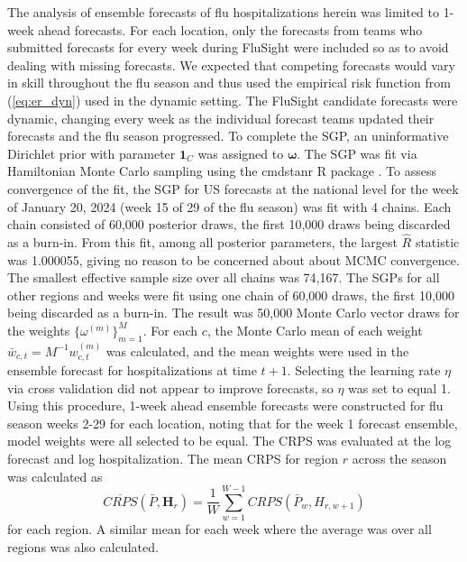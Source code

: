 The analysis of ensemble forecasts of flu hospitalizations herein was limited 
to 1-week ahead forecasts. For each location, only the forecasts from teams 
who submitted forecasts for every week during FluSight were included 
so as to avoid dealing with missing forecasts. We expected that 
competing forecasts would vary in skill throughout the flu season and thus 
used the empirical risk function from (\ref{eq:er_dyn}) used in the dynamic 
setting. The FluSight candidate forecasts were dynamic, changing every week 
as the individual 
forecast teams updated their forecasts and the flu season progressed.
To complete the SGP, an uninformative Dirichlet prior with parameter 
$\mathbf{1}_C$ was assigned to $\boldsymbol{\omega}$. 
The SGP was fit via Hamiltonian 
Monte Carlo sampling using the cmdstanr R package 
\cite[]{stan2024manual,gabry2022stan}. To assess convergence of the fit, 
the SGP for US forecasts at the national level for the week of 
January 20, 2024 (week 15 of 29 of the flu season) was fit with 4 chains. 
Each chain consisted of 60,000 posterior draws, the first 10,000 draws being 
discarded as a burn-in. From this fit, among all posterior parameters, the 
largest $\hat{R}$ statistic \cite[]{vehtari2021rank} was 1.000055, giving 
no reason to be concerned about about MCMC convergence. The smallest 
effective sample size \cite[]{gelman2013bayesian} over all chains was 74,167. 
The SGPs for all other regions and weeks were fit using one chain of 60,000 
draws, the first 10,000 being discarded as a burn-in. The result was 50,000 
Monte Carlo vector draws for the weights $\{\omega^{(m)}\}_{m = 1}^M$.
For each $c$, the Monte Carlo mean of each weight 
$\bar{w}_{c,t} = M^{-1}w^{(m)}_{c,t}$ was calculated, and the mean weights 
were used in the ensemble forecast for hospitalizations at time $t+1$. 
Selecting the learning rate $\eta$ via cross validation did not appear to 
improve forecasts,
so $\eta$ was set to equal 1.
Using this procedure, 1-week ahead ensemble forecasts were constructed for 
flu season weeks 2-29 for each location, noting that for the week 1 forecast 
ensemble, model weights were all selected to be equal. The CRPS was 
evaluated at the log forecast and log hospitalization. The mean CRPS for 
region $r$ across the season was calculated as
\[
    \overline{CRPS}(\bar{P}, \boldsymbol{H}_r) = 
    \frac{1}{W}\sum_{w = 1}^{W-1} CRPS(\bar{P}_w, H_{r,w + 1})
\]
for each region. A similar mean for each week where the average was over 
all regions was also calculated.


